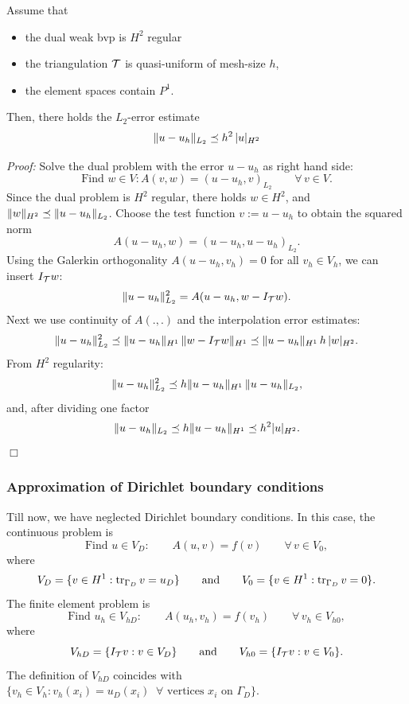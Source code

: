 \begin{theorem} Assume that 
\begin{itemize}
\item the dual weak bvp is $H^2$ regular
\item the triangulation ${\cal T}$ is quasi-uniform of mesh-size $h$,
\item the element spaces contain $P^1$.
\end{itemize}
Then, there holds the $L_2$-error estimate
$$
\| u - u_h \|_{L_2} \preceq h^2 \, | u |_{H^2}
$$
\end{theorem}
{\em Proof:} 
Solve the dual problem with the error $u - u_h$ as right hand side:
$$
\mbox{Find } w \in V : A(v,w) = (u-u_h, v)_{L_2} \qquad \forall \, v \in V.
$$
Since the dual problem is $H^2$ regular, there holds $w\in H^2$, and $\| w \|_{H^2} \preceq \| u-u_h \|_{L_2}$. Choose the test function $v := u - u_h$ to obtain the squared norm
$$
A(u-u_h, w) = (u-u_h, u-u_h)_{L_2}.
$$
Using the Galerkin orthogonality $A(u-u_h, v_h) = 0$ for all $v_h \in V_h$, we can insert $I_{\cal T} w$:
$$
\| u - u_h \|_{L_2}^2 = A(u-u_h, w-I_{\cal T} w).
$$
Next we use continuity of $A(.,.)$ and the interpolation error estimates:
$$
\| u - u_h \|_{L_2}^2 \preceq \| u - u_h \|_{H^1} \, \| w - I_{\cal T} w \|_{H^1}
        \preceq \| u - u_h \|_{H^1} \, h \, | w  |_{H^2}.
$$
From $H^2$ regularity:
$$
\| u - u_h \|_{L_2}^2 \preceq h \| u - u_h \|_{H^1} \, \| u - u_h \|_{L_2},
$$
and, after dividing one factor
$$
\| u - u_h \|_{L_2} \preceq h \| u - u_h \|_{H^1} \preceq h^2 | u |_{H^2}.
$$
\hfill $\Box$
\bigskip


\subsubsection{Approximation of Dirichlet boundary conditions}
Till now, we have neglected Dirichlet boundary conditions. In this case, the continuous problem is
$$
\mbox{Find } u \in V_D : \qquad A(u,v) = f(v) \qquad \forall \, v \in V_0,
$$
where
$$
V_D = \{ v \in H^1 : \operatorname{tr}_{\Gamma_D} v = u_D \} \qquad \mbox{and} \qquad
V_0 = \{ v \in H^1 : \operatorname{tr}_{\Gamma_D} v = 0 \}.
$$
The finite element problem is
$$
\mbox{Find } u_h \in V_{hD} : \qquad A(u_h,v_h) = f(v_h) \qquad \forall \, v_h \in V_{h0},
$$
where
$$
V_{hD} = \{ I_{\cal T} v : v \in V_D \} \qquad \mbox{and} \qquad
V_{h0} = \{ I_{\cal T} v : v \in V_0 \}.
$$
The definition of $V_{hD}$ coincides with
$
\{ v_h \in V_h : v_h(x_i) = u_D(x_i) \; \; \forall \mbox{ vertices } x_i \mbox{ on } \Gamma_D \}.
$

